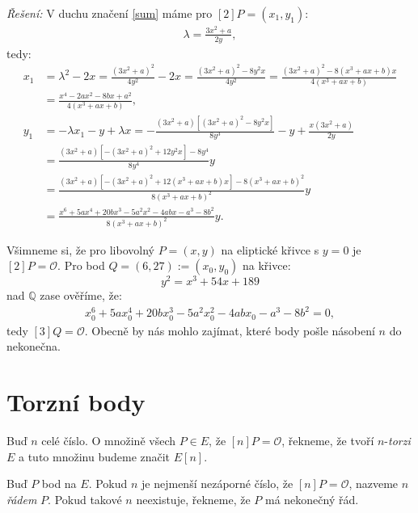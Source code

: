 \documentclass [12pt]{report}
\begin{document}
\textit{Řešení: } V duchu značení \eqref{sum} máme pro $[2] P = (x_1,y_1)$:
\begin{align*}
\lambda = \frac{3x^2 + a}{2y},
\end{align*}
tedy:
\begin{align*}
x_1 &= \lambda^2 - 2x = \frac{(3x^2 + a)^2}{4 y ^2} - 2x = \frac{(3x ^2 + a)^2 - 8 y^2 x }{4 y ^2} = \frac{(3x ^2 + a)^2 - 8 (x^3+ax+b) x }{4 (x^3+ax+b)}\\
&= \frac{x^4-2a x^2 - 8bx + a^2}{4 (x^3+ax+b)},\\
y_1 &=  - \lambda x_1 - y + \lambda x = - \frac{(3x^2 + a)[(3x ^2 + a)^2 - 8 y^2 x ]}{8y^3} - y + \frac{x(3x^2 + a)}{2y}\\
&= \frac{(3x^2 + a)[-(3x ^2 + a)^2 + 12 y^2 x] - 8y^4}{8y^4} y \\
&=  \frac{(3x^2 + a)[-(3x ^2 + a)^2 + 12 (x^3 + ax + b) x] - 8 (x^3 + ax + b)^2}{8(x^3 + ax + b)^2} y\\
&= \frac{x^6 + 5 a x^4 + 20 b x^3 - 5 a^2 x^2 - 4ab x - a^3 - 8 b^2}{8(x^3 + ax + b)^2} y.  \tag*{$\square$}
\end{align*}


Všimneme si, že pro libovolný $P = (x,y)$ na eliptické křivce s $y=0$ je $[2] P = \mathcal{O}$. Pro bod $Q = (6,27) := (x_0,y_0)$ na křivce:
\begin{equation*}
y^2 = x^3 +54x+189
\end{equation*}
nad $\mathbb{Q}$ zase ověříme, že:
\begin{align*}
x_0^6 + 5 a x_0^4 + 20 b x_0^3 - 5 a^2 x_0^2 - 4ab x_0 - a^3 - 8 b^2 = 0,
\end{align*}
tedy $[3]Q = \mathcal{O}$. Obecně by nás mohlo zajímat, které body pošle násobení $n$ do nekonečna.

\section{Torzní body}

\begin{definice}
Buď $n$ celé číslo. O množině všech $P \in E$, že $[n] P = \mathcal{O}$, řekneme, že tvoří $n$-\textit{torzi} $E$ a tuto množinu budeme značit $E[n]$.
\end{definice}

\begin{definice}
Buď $P$ bod na $E$. Pokud $n$ je nejmenší nezáporné číslo, že $[n]P = \mathcal{O}$, nazveme $n$ \textit{řádem} $P$. Pokud takové $n$ neexistuje, řekneme, že $P$ má nekonečný řád.
\end{definice}
\end{document}
